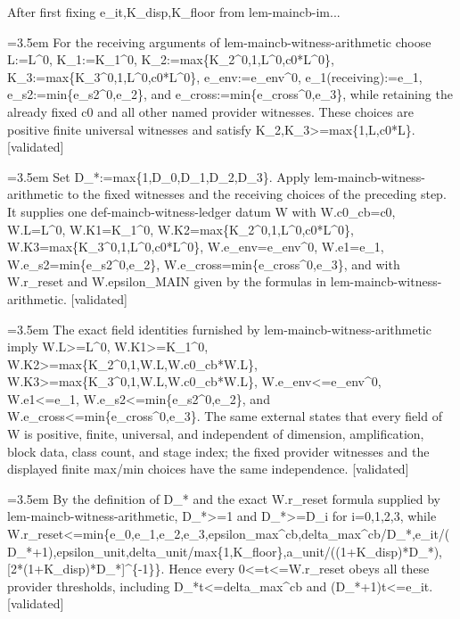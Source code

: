\documentclass{article}
\newcommand{\step}[1]{\par\noindent\hangindent=3.5em\hangafter=1%
  \makebox[3.5em][l]{\textbf{#1.}}}
\newcommand{\steptag}[1]{\hfill{\small\textsf{[#1]}}}
\begin{document}
\begin{proofbox}{After first fixing e\_it,K\_disp,K\_floor from lem-maincb-im...}
\step{1.1} For the receiving arguments of lem-maincb-witness-arithmetic choose L:=L\textasciicircum{}0, K\_1:=K\_1\textasciicircum{}0, K\_2:=max\{K\_2\textasciicircum{}0,1,L\textasciicircum{}0,c0*L\textasciicircum{}0\}, K\_3:=max\{K\_3\textasciicircum{}0,1,L\textasciicircum{}0,c0*L\textasciicircum{}0\}, e\_env:=e\_env\textasciicircum{}0, e\_1(receiving):=e\_1, e\_s2:=min\{e\_s2\textasciicircum{}0,e\_2\}, and e\_cross:=min\{e\_cross\textasciicircum{}0,e\_3\}, while retaining the already fixed c0 and all other named provider witnesses. These choices are positive finite universal witnesses and satisfy K\_2,K\_3>=max\{1,L,c0*L\}. \steptag{validated} \\[4pt]
\step{1.2} Set D\_*:=max\{1,D\_0,D\_1,D\_2,D\_3\}. Apply lem-maincb-witness-arithmetic to the fixed witnesses and the receiving choices of the preceding step. It supplies one def-maincb-witness-ledger datum W with W.c0\_cb=c0, W.L=L\textasciicircum{}0, W.K1=K\_1\textasciicircum{}0, W.K2=max\{K\_2\textasciicircum{}0,1,L\textasciicircum{}0,c0*L\textasciicircum{}0\}, W.K3=max\{K\_3\textasciicircum{}0,1,L\textasciicircum{}0,c0*L\textasciicircum{}0\}, W.e\_env=e\_env\textasciicircum{}0, W.e1=e\_1, W.e\_s2=min\{e\_s2\textasciicircum{}0,e\_2\}, W.e\_cross=min\{e\_cross\textasciicircum{}0,e\_3\}, and with W.r\_reset and W.epsilon\_MAIN given by the formulas in lem-maincb-witness-arithmetic. \steptag{validated} \\[4pt]
\step{1.3} The exact field identities furnished by lem-maincb-witness-arithmetic imply W.L>=L\textasciicircum{}0, W.K1>=K\_1\textasciicircum{}0, W.K2>=max\{K\_2\textasciicircum{}0,1,W.L,W.c0\_cb*W.L\}, W.K3>=max\{K\_3\textasciicircum{}0,1,W.L,W.c0\_cb*W.L\}, W.e\_env<=e\_env\textasciicircum{}0, W.e1<=e\_1, W.e\_s2<=min\{e\_s2\textasciicircum{}0,e\_2\}, and W.e\_cross<=min\{e\_cross\textasciicircum{}0,e\_3\}. The same external states that every field of W is positive, finite, universal, and independent of dimension, amplification, block data, class count, and stage index; the fixed provider witnesses and the displayed finite max/min choices have the same independence. \steptag{validated} \\[4pt]
\step{1.4} By the definition of D\_* and the exact W.r\_reset formula supplied by lem-maincb-witness-arithmetic, D\_*>=1 and D\_*>=D\_i for i=0,1,2,3, while W.r\_reset<=min\{e\_0,e\_1,e\_2,e\_3,epsilon\_max\textasciicircum{}cb,delta\_max\textasciicircum{}cb/D\_*,e\_it/(D\_*+1),epsilon\_unit,delta\_unit/max\{1,K\_floor\},a\_unit/((1+K\_disp)*D\_*),[2*(1+K\_disp)*D\_*]\textasciicircum{}\{-1\}\}. Hence every 0<=t<=W.r\_reset obeys all these provider thresholds, including D\_*t<=delta\_max\textasciicircum{}cb and (D\_*+1)t<=e\_it. \steptag{validated} \\[4pt]

\end{proofbox}
\end{document}
